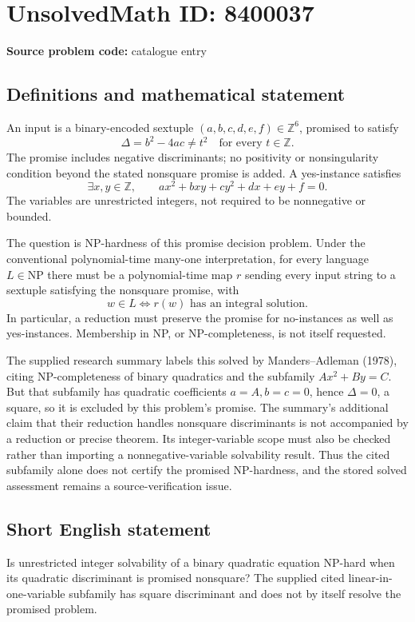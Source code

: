 \documentclass[11pt]{article}
\newcommand{\Z}{\mathbb{Z}}
\begin{document}
\section*{UnsolvedMath ID: 8400037}
\textbf{Source problem code:} catalogue entry
\subsection{Definitions and mathematical statement}
An input is a binary-encoded sextuple \((a,b,c,d,e,f)\in\Z^6\), promised to satisfy
\[
\Delta=b^2-4ac\ne t^2\quad\text{for every }t\in\Z.
\]
The promise includes negative discriminants; no positivity or nonsingularity condition beyond the stated nonsquare promise is added. A yes-instance satisfies
\[
\exists x,y\in\Z,\qquad ax^2+bxy+cy^2+dx+ey+f=0.
\]
The variables are unrestricted integers, not required to be nonnegative or bounded.

The question is NP-hardness of this promise decision problem. Under the conventional polynomial-time many-one interpretation, for every language \(L\in\mathrm{NP}\) there must be a polynomial-time map \(r\) sending every input string to a sextuple satisfying the nonsquare promise, with
\[
w\in L\iff r(w)\text{ has an integral solution}.
\]
In particular, a reduction must preserve the promise for no-instances as well as yes-instances. Membership in NP, or NP-completeness, is not itself requested.

The supplied research summary labels this solved by Manders--Adleman (1978), citing NP-completeness of binary quadratics and the subfamily \(Ax^2+By=C\). But that subfamily has quadratic coefficients \(a=A,b=c=0\), hence \(\Delta=0\), a square, so it is excluded by this problem's promise. The summary's additional claim that their reduction handles nonsquare discriminants is not accompanied by a reduction or precise theorem. Its integer-variable scope must also be checked rather than importing a nonnegative-variable solvability result. Thus the cited subfamily alone does not certify the promised NP-hardness, and the stored solved assessment remains a source-verification issue.
\subsection{Short English statement}
Is unrestricted integer solvability of a binary quadratic equation NP-hard when its quadratic discriminant is promised nonsquare? The supplied cited linear-in-one-variable subfamily has square discriminant and does not by itself resolve the promised problem.
\end{document}
